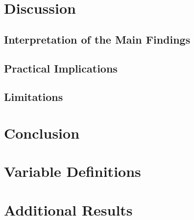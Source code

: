 \documentclass[12pt,a4paper,oneside,titlepage]{book}
\newif\ifthesisdraft
\newcommand{\draftnote}[1]{%
  \ifthesisdraft
    \par\noindent\colorbox{yellow!20}{%
      \parbox{0.94\textwidth}{\textbf{Draft note:} #1}%
    }\par
  \fi
}
\begin{document}
\chapter{Discussion}
\label{ch:discussion}

\section{Interpretation of the Main Findings}
\draftnote{Answer the research question directly and distinguish conclusions supported by the in-sample benchmark from those supported by temporal validation.}

\section{Practical Implications}
\draftnote{Discuss when predicted wages improve on top-coded BG values and where the uncorrected BG measure remains difficult to beat.}

\section{Limitations}
\draftnote{Discuss model dependence, sample selection, temporal transportability, extreme wages, measurement differences between BG and LZ, and limits to causal interpretation.}

\chapter{Conclusion}
\label{ch:conclusion}
\draftnote{Summarise the question, approach, central result, contribution, limitations, and the most credible next research step without introducing new evidence.}

\appendix

\chapter{Variable Definitions}
\label{app:variables}
\draftnote{Add a complete variable dictionary with source, construction, timing, and model inclusion in Tobit V1, XGBoost V1, and XGBoost V4.}

\chapter{Additional Results}
\label{app:additional-results}
\draftnote{Place detailed tables, alternative plots, uncensored-sample results, and backup analyses here.}
\end{document}
